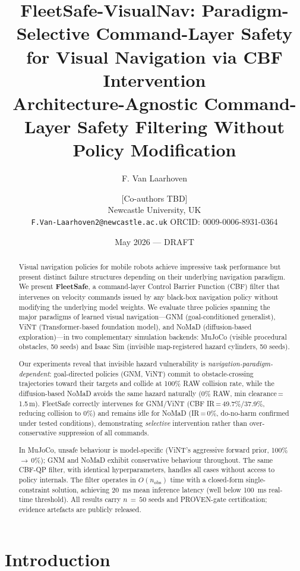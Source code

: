 \documentclass[letterpaper]{article}
\title{\textbf{FleetSafe-VisualNav: Paradigm-Selective Command-Layer Safety
       for Visual Navigation via CBF Intervention}\\[4pt]
       \large Architecture-Agnostic Command-Layer Safety Filtering Without Policy Modification}
\author{F. Van Laarhoven \and [Co-authors TBD]\\
  \small Newcastle University, UK\\
  \small \texttt{F.Van-Laarhoven2@newcastle.ac.uk} \quad
  ORCID: 0009-0006-8931-0364}
\date{May 2026 — DRAFT}
\begin{document}
\maketitle
\begin{abstract}
Visual navigation policies for mobile robots achieve impressive task performance
but present distinct failure structures depending on their underlying navigation
paradigm. We present \textbf{FleetSafe}, a command-layer Control Barrier Function
(CBF) filter that intervenes on velocity commands issued by any black-box
navigation policy without modifying the underlying model weights.
We evaluate three policies spanning the major paradigms of learned visual
navigation---GNM (goal-conditioned generalist), ViNT (Transformer-based
foundation model), and NoMaD (diffusion-based exploration)---in two complementary
simulation backends: MuJoCo (visible procedural obstacles, 50 seeds) and
Isaac Sim (invisible map-registered hazard cylinders, 50 seeds).

Our experiments reveal that invisible hazard vulnerability is
\emph{navigation-paradigm-dependent}: goal-directed policies (GNM, ViNT)
commit to obstacle-crossing trajectories toward their targets and collide at
100\% RAW collision rate, while the diffusion-based NoMaD avoids the same hazard
naturally (0\% RAW, min clearance\,=\,1.5\,m). FleetSafe correctly intervenes
for GNM/ViNT (CBF IR\,=\,49.7\%/37.9\%, reducing collision to 0\%) and
remains idle for NoMaD (IR\,=\,0\%, do-no-harm confirmed under tested
conditions), demonstrating \emph{selective} intervention rather than
over-conservative suppression of all commands.

In MuJoCo, unsafe behaviour is model-specific (ViNT's aggressive forward prior,
100\%\,$\to$\,0\%); GNM and NoMaD exhibit conservative behaviour throughout.
The same CBF-QP filter, with identical hyperparameters, handles all cases
without access to policy internals. The filter operates in $O(n_{\text{obs}})$
time with a closed-form single-constraint solution, achieving
\SI{20}{\milli\second} mean inference latency (well below \SI{100}{\milli\second}
real-time threshold). All results carry $n\,{=}\,50$ seeds and PROVEN-gate
certification; evidence artefacts are publicly released.
\end{abstract}

\section{Introduction}
\label{sec:intro}
\end{document}
